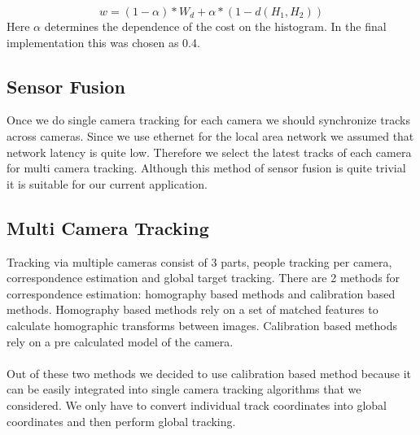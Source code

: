 \documentclass[12pt,a4paper]{report}
\begin{document}
\begin{equation}
\label{eqn:association3}
w = (1-\alpha)*W_d + \alpha*(1-d(H_1,H_2))
\end{equation}
Here $\alpha$ determines the dependence of the cost on the histogram. In the final implementation this was chosen as 0.4.
\subsection{Sensor Fusion}
Once we do single camera tracking for each camera we should synchronize tracks across cameras. Since we use ethernet for the local area network we assumed that network latency is quite low. Therefore we select the latest tracks of each camera for multi camera tracking. Although this method of sensor fusion is quite trivial it is suitable for our current application.

\subsection{Multi Camera Tracking}

Tracking via multiple cameras consist of 3 parts, people tracking per camera, correspondence estimation and global target tracking. There are 2 methods for correspondence estimation: homography based methods and calibration based methods. Homography based methods rely on a set of matched features to calculate homographic transforms between images. Calibration based methods rely on a pre calculated model of the camera.\\\\
Out of these two methods we decided to use calibration based method because it can be easily integrated into single camera tracking algorithms that we considered. We only have to convert individual track coordinates into global coordinates and then perform global tracking.
\end{document}
